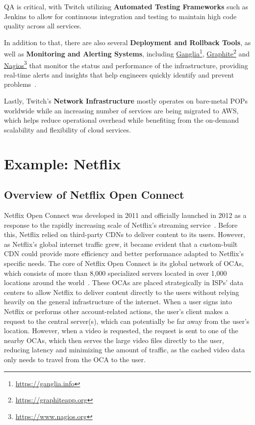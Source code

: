 \begin{enumerate}
    \ac{QA} is critical, with Twitch utilizing \textbf{Automated Testing Frameworks} such as Jenkins to allow for continuous integration and testing to maintain high code quality across all services.

    In addition to that, there are also several \textbf{Deployment and Rollback Tools}, as well as \textbf{Monitoring and Alerting Systems}, including \href{https://ganglia.info}{Ganglia}\footnote{\url{https://ganglia.info}}, \href{https://graphiteapp.org}{Graphite}\footnote{\url{https://graphiteapp.org}} and \href{https://www.nagios.org}{Nagios}\footnote{\url{https://www.nagios.org}} that monitor the status and performance of the infrastructure, providing real-time alerts and insights that help engineers quickly identify and prevent problems~\parencite{twitch_engineering}.

    Lastly, Twitch’s \textbf{Network Infrastructure} mostly operates on bare-metal \ac{POPs} worldwide while an increasing number of services are being migrated to \ac{AWS}, which helps reduce operational overhead while benefiting from the on-demand scalability and flexibility of cloud services.

\end{enumerate}

\section{Example: Netflix}


\subsection{Overview of Netflix Open Connect}

Netflix Open Connect was developed in 2011 and officially launched in 2012 as a response to the rapidly increasing scale of Netflix's streaming service~\parencite{netflix_functionality}. Before this, Netflix relied on third-party \ac{CDN}s to deliver content to its users. However, as Netflix's global internet traffic grew, it became evident that a custom-built \ac{CDN} could provide more efficiency and better performance adapted to Netflix's specific needs.
The core of Netflix Open Connect is its global network of \ac{OCAs}, which consists of more than 8,000 specialized servers located in over 1,000 locations around the world~\parencite{netflix_open_connect}. These \ac{OCAs} are placed strategically in \ac{ISPs}' data centers to allow Netflix to deliver content directly to the users without relying heavily on the general infrastructure of the internet.
When a user signs into Netflix or performs other account-related actions, the user's client makes a request to the central server(s), which can potentially be far away from the user's location. However, when a video is requested, the request is sent to one of the nearby \ac{OCAs}, which then serves the large video files directly to the user, reducing latency and minimizing the amount of traffic, as the cached video data only needs to travel from the OCA to the user.

